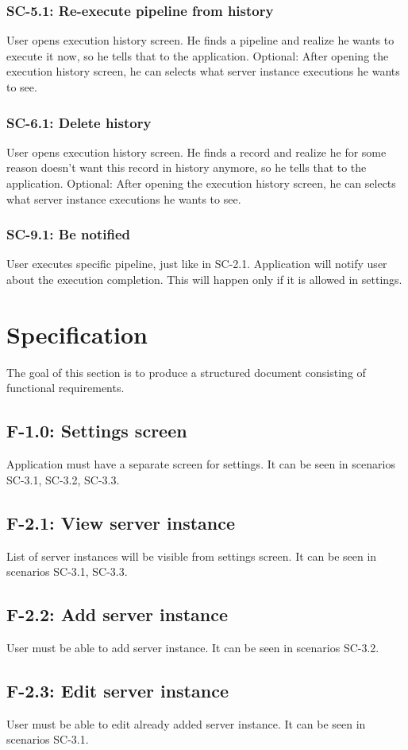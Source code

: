 \subsubsection*{SC-5.1: Re-execute pipeline from history}
User opens execution history screen. He finds a pipeline and realize he wants to execute it now, so he tells that to the application. Optional: After opening the execution history screen, he can selects what server instance executions he wants to see.
\subsubsection*{SC-6.1: Delete history}
User opens execution history screen. He finds a record and realize he for some reason doesn't want this record in history anymore, so he tells that to the application. Optional: After opening the execution history screen, he can selects what server instance executions he wants to see.
\subsubsection*{SC-9.1: Be notified}
User executes specific pipeline, just like in SC-2.1. Application will notify user about the execution completion. This will happen only if it is allowed in settings.

\section{Specification}
The goal of this section is to produce a structured document consisting of functional requirements.

\subsection*{F-1.0: Settings screen}
Application must have a separate screen for settings. It can be seen in scenarios SC-3.1, SC-3.2, SC-3.3.
\subsection*{F-2.1: View server instance}
List of server instances will be visible from settings screen. It can be seen in scenarios SC-3.1, SC-3.3.
\subsection*{F-2.2: Add server instance}
User must be able to add server instance. It can be seen in scenarios SC-3.2.
\subsection*{F-2.3: Edit server instance}
User must be able to edit already added server instance. It can be seen in scenarios SC-3.1.
